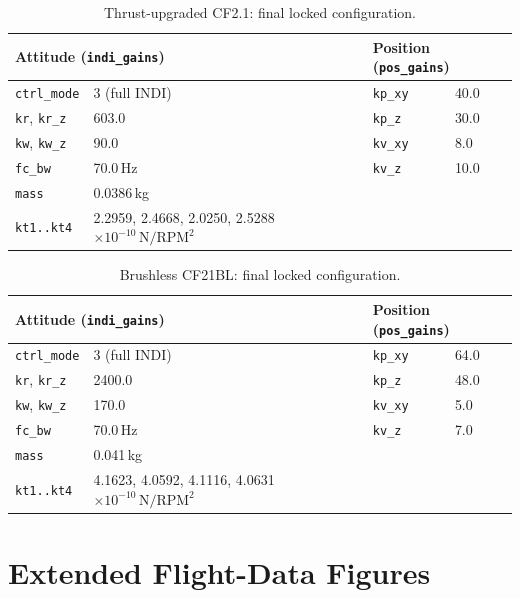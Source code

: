 \documentclass[11pt,a4paper]{article}
\newcommand{\code}[1]{\texttt{#1}}
\begin{document}
\begin{table}[H]
\centering
\begin{tabular}{@{}llll@{}}
\toprule
\multicolumn{2}{l}{\textbf{Attitude (\code{indi\_gains})}} & \multicolumn{2}{l}{\textbf{Position (\code{pos\_gains})}} \\
\midrule
\code{ctrl\_mode} & 3 (full INDI) & \code{kp\_xy} & 40.0 \\
\code{kr}, \code{kr\_z} & 603.0 & \code{kp\_z} & 30.0 \\
\code{kw}, \code{kw\_z} & 90.0 & \code{kv\_xy} & 8.0 \\
\code{fc\_bw} & 70.0\,Hz & \code{kv\_z} & 10.0 \\
\code{mass} & 0.0386\,kg & & \\
\code{kt1..kt4} & 2.2959, 2.4668, 2.0250, 2.5288 $\times10^{-10}\,\mathrm{N/RPM^2}$ & & \\
\bottomrule
\end{tabular}
\caption{Thrust-upgraded CF2.1: final locked configuration.}
\label{tab:upgraded-config}
\end{table}

\begin{table}[H]
\centering
\begin{tabular}{@{}llll@{}}
\toprule
\multicolumn{2}{l}{\textbf{Attitude (\code{indi\_gains})}} & \multicolumn{2}{l}{\textbf{Position (\code{pos\_gains})}} \\
\midrule
\code{ctrl\_mode} & 3 (full INDI) & \code{kp\_xy} & 64.0 \\
\code{kr}, \code{kr\_z} & 2400.0 & \code{kp\_z} & 48.0 \\
\code{kw}, \code{kw\_z} & 170.0 & \code{kv\_xy} & 5.0 \\
\code{fc\_bw} & 70.0\,Hz & \code{kv\_z} & 7.0 \\
\code{mass} & 0.041\,kg & & \\
\code{kt1..kt4} & 4.1623, 4.0592, 4.1116, 4.0631 $\times10^{-10}\,\mathrm{N/RPM^2}$ & & \\
\bottomrule
\end{tabular}
\caption{Brushless CF21BL: final locked configuration.}
\label{tab:brushless-config}
\end{table}

\clearpage
\section{Extended Flight-Data Figures}
\label{sec:appendix-figures}
\end{document}
